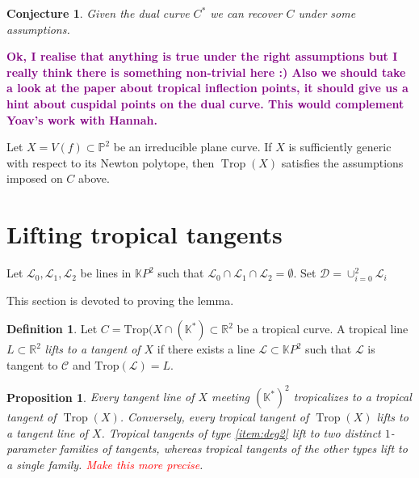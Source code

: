 \documentclass[oneside]{amsart}
\newcommand{\KK}{\mathbb{K}}
\newcommand{\PP}{\mathbb{P}}
\DeclareMathOperator{\trop}{Trop}
\newtheorem{prop}[thm]{Proposition}
\newtheorem{conj}[thm]{Conjecture}
\theoremstyle{definition}
\newtheorem{defn}[thm]{Definition}
\newcommand{\nathan}[1]{\textcolor{red}{#1}}
\newcommand{\kristin}[1]{\textcolor{purple}{#1}}
\begin{document}
\begin{conj}
Given the dual curve $C^*$ we can recover $C$ under some assumptions. 
\end{conj}

\kristin{\textbf{Ok, I realise that anything is true under the right
assumptions but I really think there is something non-trivial here :) Also we
should take a look at the paper about tropical inflection points, it should
give us a hint about cuspidal points on the dual curve. This would complement
Yoav's work with Hannah.}}

Let $X=V(f)\subset \PP^2$ be an irreducible plane curve. If $X$ is sufficiently generic with respect to its Newton polytope, then $\trop(X)$ satisfies the assumptions imposed on $C$ above.

\section{Lifting tropical tangents}



Let  $\mathcal{L}_0, \mathcal{L}_1, \mathcal{L}_2$ be lines in $\mathbb{K}P^2$ such that  $\mathcal{L}_0 \cap \mathcal{L}_1 \cap \mathcal{L}_2 = \emptyset$. Set $\mathcal{D} = \cup_{i = 0}^2 \mathcal{L}_i$

This section is devoted to proving the lemma. 

\begin{defn}
Let $C  = \text{Trop}(X \cap (\KK^*) \subset \mathbb{R}^2$ be a tropical curve. A tropical line $L \subset \mathbb{R}^2$  \textit{lifts to a  tangent of $X$} if there exists 
a line $\mathcal{L} \subset \mathbb{K}P^2$ such that $\mathcal{L}$ is tangent to $\mathcal{C}$ and  $\text{Trop}(\mathcal{L}) = L$. 

\end{defn}

\begin{prop}\label{prop:lifting}
Every tangent line of $X$ meeting $(\KK^*)^2$ tropicalizes to a tropical tangent of $\trop(X)$. Conversely, every tropical tangent of $\trop(X)$ lifts to a tangent line of $X$. Tropical tangents of type \ref{item:deg2} lift to two distinct $1$-parameter families of tangents, whereas tropical tangents of the other types lift to a single family. \nathan{Make this more precise}.
\end{prop}
\end{document}
